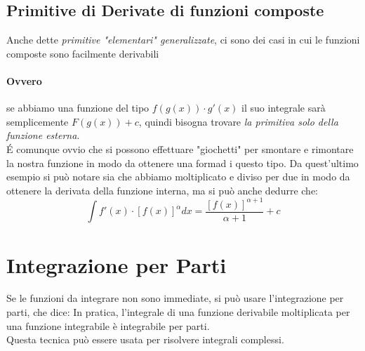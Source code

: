 \subsection{Primitive di Derivate di funzioni composte}
Anche dette \emph{primitive "elementari" generalizzate}, ci sono dei casi in cui le funzioni composte sono facilmente derivabili
\paragraph*{Ovvero} se abbiamo una funzione del tipo $f(g(x)) \cdot g'(x)$ il suo integrale sarà semplicemente $F(g(x)) + c$, quindi bisogna trovare \emph{la primitiva solo della funzione esterna}.
\\\'E comunque ovvio che si possono effettuare "giochetti" per smontare e rimontare la nostra funzione in modo da ottenere una formad i questo tipo.
Da quest'ultimo esempio si può notare sia che abbiamo moltiplicato e diviso per due in modo da ottenere la derivata della funzione interna,
ma si può anche dedurre che:
$$
\int f'(x) \cdot [ f(x)]^\alpha dx = \frac{[f(x)]^{\alpha+1}}{\alpha + 1} + c
$$


\section{Integrazione per Parti}
Se le funzioni da integrare non sono immediate, si può usare l'integrazione per parti, che dice:
In pratica, l'integrale di una funzione derivabile moltiplicata per una funzione integrabile è integrabile per parti.
\\Questa tecnica può essere usata per risolvere integrali complessi.

